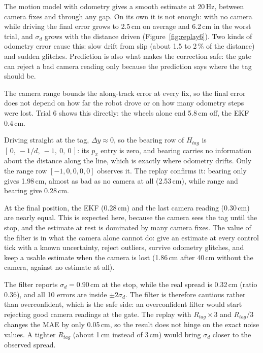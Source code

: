  The motion model with odometry gives a smooth estimate at 20\,Hz, between camera fixes and through
any gap. On its own it is not enough: with no camera while driving the final error grows to 2.5\,cm on average and
6.2\,cm in the worst trial, and $\sigma_d$ grows with the distance driven (Figure~\ref{fig:replay6}). Two kinds of
odometry error cause this: slow drift from slip (about 1.5 to 2\,\% of the distance) and sudden glitches. Prediction is
also what makes the correction safe: the gate can reject a bad camera reading only because the prediction says where
the tag should be.

 The camera range bounds the along-track error at every fix, so the final error does not depend on
how far the robot drove or on how many odometry steps were lost. Trial 6 shows this directly: the wheels alone end
5.8\,cm off, the EKF 0.4\,cm.

 Driving straight at the tag, $\Delta y\approx0$, so the bearing row
of $H_{tag}$ is $[\,0,\ -1/d,\ -1,\ 0,\ 0\,]$: its $p_x$ entry is zero, and bearing carries no information about the
distance along the line, which is exactly where odometry drifts. Only the range row $[-1,0,0,0,0]$ observes it.
The replay confirms it: bearing only gives 1.98\,cm, almost as bad as no camera at all (2.53\,cm), while range and bearing
give 0.28\,cm.

 At the final position, the EKF (0.28\,cm) and the last camera reading (0.30\,cm) are
nearly equal. This is expected here, because the camera sees the tag until the stop, and the estimate at rest is
dominated by many camera fixes. The value of the filter is in what the camera alone cannot do: give an estimate at
every control tick with a known uncertainty, reject outliers, survive odometry glitches, and keep a usable estimate when
the camera is lost (1.86\,cm after 40\,cm without the camera, against no estimate at all).

\label{sec:consistency}
The filter reports $\sigma_d=0.90$\,cm at the stop, while the real spread is 0.32\,cm (ratio 0.36), and all 10 errors are
inside $\pm2\sigma_d$. The filter is therefore cautious rather than overconfident, which is the safe side: an overconfident
filter would start rejecting good camera readings at the gate. The replay with $R_{tag}\times3$ and $R_{tag}/3$ changes
the MAE by only 0.05\,cm, so the result does not hinge on the exact noise values. A tighter $R_{tag}$ (about 1\,cm
instead of 3\,cm) would bring $\sigma_d$ closer to the observed spread.

